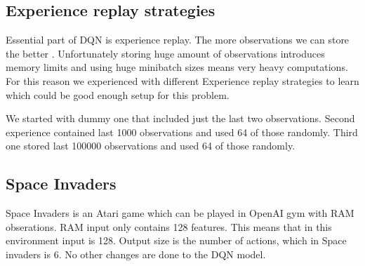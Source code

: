 \subsection{Experience replay strategies}
Essential part of DQN is experience replay. The more observations we can store the better \cite{mnih2015human}. Unfortunately storing huge amount of observations introduces memory limits and using huge minibatch sizes means very heavy computations. For this reason we experienced with different Experience replay strategies to learn which could be good enough setup for this problem.

We started with dummy one that included just the last two observations. Second experience contained last 1000 observations and used 64 of those randomly. Third one stored last 100000 observations and used 64 of those randomly.

\subsection{Space Invaders}
Space Invaders is an Atari game which can be played in OpenAI gym with RAM obserations. RAM input only contains 128 features. This means that in this environment input is 128. Output size is the number of actions, which in Space invaders is 6. No other changes are done to the DQN model.